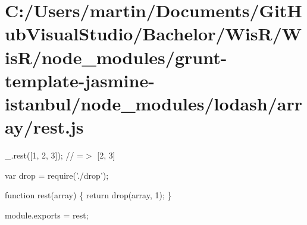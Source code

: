 \hypertarget{_c_1_2_users_2martin_2_documents_2_git_hub_visual_studio_2_bachelor_2_wis_r_2_wis_r_2node_module665242255d5b4c022445f1e15747dec4}{}\section{C\+:/\+Users/martin/\+Documents/\+Git\+Hub\+Visual\+Studio/\+Bachelor/\+Wis\+R/\+Wis\+R/node\+\_\+modules/grunt-\/template-\/jasmine-\/istanbul/node\+\_\+modules/lodash/array/rest.\+js}
\+\_\+.\+rest(\mbox{[}1, 2, 3\mbox{]}); // =$>$ \mbox{[}2, 3\mbox{]}


\begin{DoxyCodeInclude}
var drop = require(\textcolor{stringliteral}{'./drop'});

\textcolor{keyword}{function} rest(array) \{
  \textcolor{keywordflow}{return} drop(array, 1);
\}

module.exports = rest;
\end{DoxyCodeInclude}
 